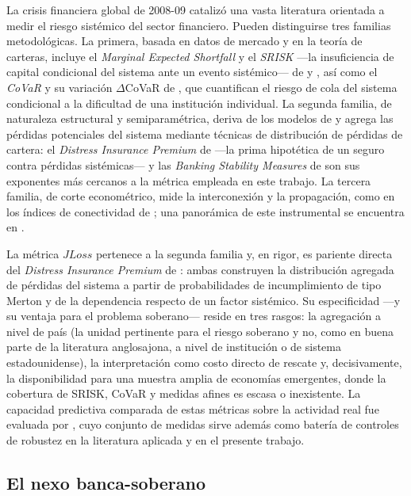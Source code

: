 La crisis financiera global de 2008-09 catalizó una vasta literatura orientada a medir el riesgo sistémico del sector financiero. Pueden distinguirse tres familias metodológicas. La primera, basada en datos de mercado y en la teoría de carteras, incluye el \textit{Marginal Expected Shortfall} y el \textit{SRISK} —la insuficiencia de capital condicional del sistema ante un evento sistémico— de \citet{AcharyaEtAl2017b} y \citet{BrownleesEngle2016}, así como el \textit{CoVaR} y su variación $\Delta$CoVaR de \citet{AdrianBrunnermeier2016b}, que cuantifican el riesgo de cola del sistema condicional a la dificultad de una institución individual. La segunda familia, de naturaleza estructural y semiparamétrica, deriva de los modelos de \citet{Merton1974b} y agrega las pérdidas potenciales del sistema mediante técnicas de distribución de pérdidas de cartera: el \textit{Distress Insurance Premium} de \citet{HuangZhouZhu2009} —la prima hipotética de un seguro contra pérdidas sistémicas— y las \textit{Banking Stability Measures} de \citet{SegovianoGoodhart2009} son sus exponentes más cercanos a la métrica empleada en este trabajo. La tercera familia, de corte econométrico, mide la interconexión y la propagación, como en los índices de conectividad de \citet{BillioEtAl2012}; una panorámica de este instrumental se encuentra en \citet{BisiasEtAl2012}.

La métrica $JLoss$ pertenece a la segunda familia y, en rigor, es pariente directa del \textit{Distress Insurance Premium} de \citet{HuangZhouZhu2009}: ambas construyen la distribución agregada de pérdidas del sistema a partir de probabilidades de incumplimiento de tipo Merton y de la dependencia respecto de un factor sistémico. Su especificidad —y su ventaja para el problema soberano— reside en tres rasgos: la agregación a nivel de país (la unidad pertinente para el riesgo soberano y no, como en buena parte de la literatura anglosajona, a nivel de institución o de sistema estadounidense), la interpretación como costo directo de rescate y, decisivamente, la disponibilidad para una muestra amplia de economías emergentes, donde la cobertura de SRISK, CoVaR y medidas afines es escasa o inexistente. La capacidad predictiva comparada de estas métricas sobre la actividad real fue evaluada por \citet{GiglioKellyPruitt2016}, cuyo conjunto de medidas sirve además como batería de controles de robustez en la literatura aplicada y en el presente trabajo.

\subsection{El nexo banca-soberano}

